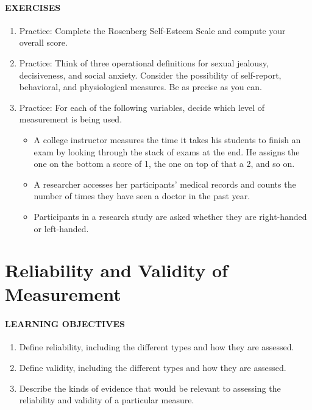 \documentclass[
]{krantz}
\providecommand{\tightlist}{%
  \setlength{\itemsep}{0pt}\setlength{\parskip}{0pt}}
\begin{document}
\hypertarget{exercises-13}{%
\paragraph*{EXERCISES}\label{exercises-13}}

\begin{enumerate}
\def\labelenumi{\arabic{enumi}.}
\tightlist
\item
  Practice: Complete the Rosenberg Self-Esteem Scale and compute your overall score.
\item
  Practice: Think of three operational definitions for sexual jealousy, decisiveness, and social anxiety. Consider the possibility of self-report, behavioral, and physiological measures. Be as precise as you can.
\item
  Practice: For each of the following variables, decide which level of measurement is being used.

  \begin{itemize}
  \tightlist
  \item
    A college instructor measures the time it takes his students to finish an exam by looking through the stack of exams at the end. He assigns the one on the bottom a score of 1, the one on top of that a 2, and so on.
  \item
    A researcher accesses her participants' medical records and counts the number of times they have seen a doctor in the past year.
  \item
    Participants in a research study are asked whether they are right-handed or left-handed.
  \end{itemize}
\end{enumerate}

\hypertarget{reliability-and-validity-of-measurement}{%
\section{Reliability and Validity of Measurement}\label{reliability-and-validity-of-measurement}}

\hypertarget{learning-objectives-16}{%
\paragraph*{LEARNING OBJECTIVES}\label{learning-objectives-16}}

\begin{enumerate}
\def\labelenumi{\arabic{enumi}.}
\tightlist
\item
  Define reliability, including the different types and how they are assessed.
\item
  Define validity, including the different types and how they are assessed.
\item
  Describe the kinds of evidence that would be relevant to assessing the reliability and validity of a particular measure.
\end{enumerate}
\end{document}
